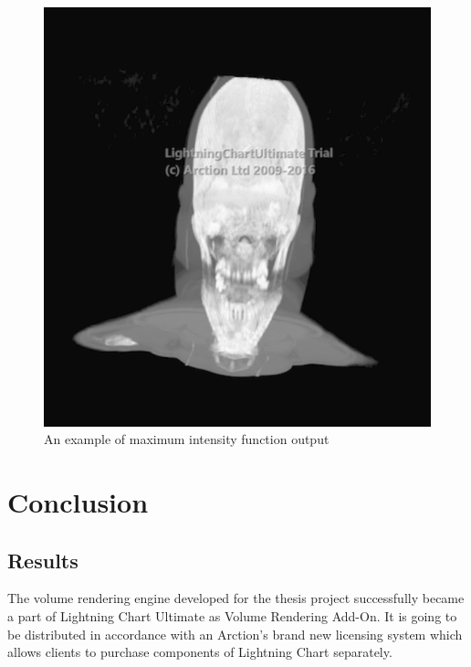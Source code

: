 \documentclass[twoside, english, 11pt]{report}
\begin{document}
\begin{figure}[!h]
\centerline{\includegraphics[scale = 0.6]{img/maxi}}
\caption{An example of maximum intensity function output\label{fig:maxi}}
\end{figure}





\chapter{Conclusion}
\section{Results}
The volume rendering engine developed for the thesis project successfully became a part of Lightning Chart Ultimate as Volume Rendering Add-On. It is going to be distributed in accordance with an Arction's brand new licensing system which allows clients to purchase components of Lightning Chart separately.\\
\end{document}
